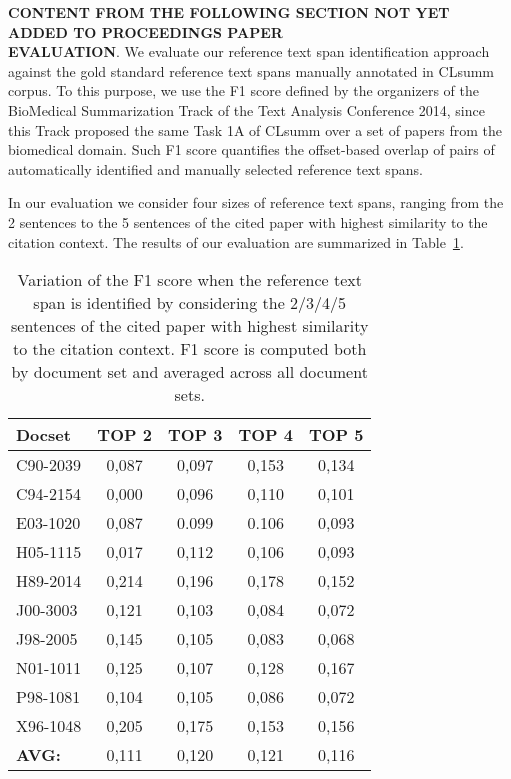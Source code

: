\documentclass[11pt]{article}
\begin{document}
\newpage
\textbf{CONTENT FROM THE FOLLOWING SECTION NOT YET ADDED TO PROCEEDINGS PAPER}\\
\textbf{EVALUATION}. We evaluate our reference text span identification approach against the gold standard reference text spans manually annotated in CLsumm corpus. To this purpose, we use the F1 score defined by the organizers of the BioMedical Summarization Track of the Text Analysis Conference 2014, since this Track proposed the same Task 1A of CLsumm over a set of papers from the biomedical domain. Such F1 score quantifies the offset-based overlap of pairs of automatically identified and manually selected reference text spans. 

In our evaluation we consider four sizes of reference text spans, ranging from the 2 sentences to the 5 sentences of the cited paper with highest similarity to the citation context. The results of our evaluation are summarized in Table~\ref{table:task1aEval}.

\begin{table}[h]\footnotesize
  \begin{center}
  \begin{tabular}{ l | c | c | c | c }
    \hline
    Docset & TOP 2 & TOP 3 & TOP 4 & TOP 5 \\ \hline
    C90-2039 & 0,087 & 0,097 & 0,153 & 0,134 \\ \hline
    C94-2154 & 0,000 & 0,096 & 0,110 & 0,101 \\ \hline
    E03-1020 & 0,087 & 0.099 & 0.106 & 0,093 \\ \hline
    H05-1115 & 0,017 & 0,112 & 0,106 & 0,093 \\ \hline
    H89-2014 & 0,214 & 0,196 & 0,178 & 0,152 \\ \hline
    J00-3003 & 0,121 & 0,103 & 0,084 & 0,072 \\ \hline
    J98-2005 & 0,145 & 0,105 & 0,083 & 0,068 \\ \hline
    N01-1011 & 0,125 & 0,107 & 0,128 & 0,167 \\ \hline
    P98-1081 & 0,104 & 0,105 & 0,086 & 0,072 \\ \hline
    X96-1048 & 0,205 & 0,175 & 0,153 & 0,156 \\ \hline
    \textbf{AVG:}  & 0,111 & 0,120 & 0,121 & 0,116 \\ \hline
    \hline
  \end{tabular}
  \caption{Variation of the F1 score when the reference text span is identified by considering the 2/3/4/5 sentences of the cited paper with highest similarity to the citation context. F1 score is computed both by document set and averaged across all document sets.}
  \label{table:task1aEval}
  \end{center}
\end{table}
\end{document}
